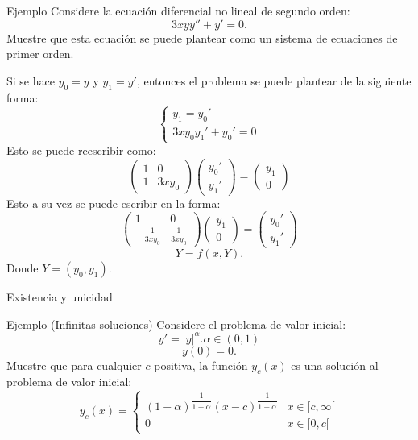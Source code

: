 \begin{frame}
\small
\begin{block}{Ejemplo}
Considere la ecuación diferencial no lineal de segundo orden:
$$3xyy''+y'=0.$$
Muestre que esta ecuación se puede plantear como un sistema de ecuaciones de primer orden.
\end{block}
Si se hace $y_0=y$ y $y_1=y'$, entonces el problema se puede plantear de la siguiente forma:
\begin{displaymath}
\left \{
\begin{array}{c}
y_1=y_0'\\
3xy_0y_1'+y_0'=0
\end{array}
\right.
\end{displaymath}
Esto se puede reescribir como:
\begin{displaymath}
\left(
\begin{array}{cc}
1 & 0\\
1 & 3xy_0
\end{array}
\right)
\left(
\begin{array}{c}
y_0'\\
y_1'
\end{array}
\right)=
\left(
\begin{array}{c}
y_1\\
0
\end{array}
\right)
\end{displaymath}
Esto a su vez se puede escribir en la forma:
\begin{displaymath}
\left(
\begin{array}{rr}
1 & 0\\
-\frac{1}{3xy_0} & \frac{1}{3xy_0}
\end{array}
\right)
\left(
\begin{array}{c}
y_1\\
0
\end{array}
\right)=
\left(
\begin{array}{c}
y_0'\\
y_1'
\end{array}
\right)
\end{displaymath}
$$Y=f(x,Y).$$
Donde $Y=(y_0,y_1).$
\end{frame}
\begin{frame}{Existencia y unicidad}
\small
\begin{block}{Ejemplo (Infinitas soluciones)}
Considere el problema de valor inicial:
$$y'=|y|^\alpha. \alpha\in (0,1)$$
$$y(0)=0.$$
Muestre que para cualquier $c$ positiva, la función $y_c(x)$ es una solución al problema de valor inicial:
\begin{displaymath}
y_c(x)=\left \{
\begin{array}{ll}
(1-\alpha)^{\dfrac{1}{1-\alpha}}(x-c)^{\dfrac{1}{1-\alpha}} & x\in [c,\infty[\\
0 & x\in [0,c[
\end{array}
\right.
\end{displaymath}
\end{block}
\end{frame}

